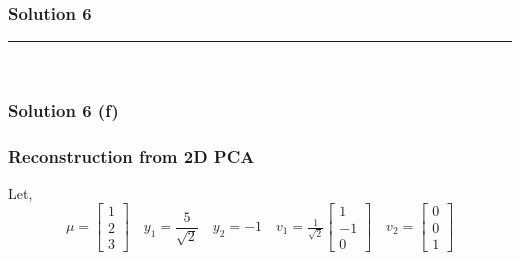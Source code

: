 \documentclass{article}
\begin{document}
{\newpage

\subsubsection*{Solution 6}
\noindent\rule{\textwidth}{0.4pt}\\
\subsubsection*{Solution 6 (f)}
\subsubsection*{Reconstruction from 2D PCA}
Let, \\
$$\mu = \begin{bmatrix}1 \\ 2 \\ 3\end{bmatrix} \quad y_1 = \frac{5}{\sqrt{2}} \quad y_2 = -1 \quad v_1=\tfrac{1}{\sqrt{2}}\begin{bmatrix}1 \\ -1 \\ 0\end{bmatrix} \quad v_2=\begin{bmatrix}0 \\ 0 \\ 1\end{bmatrix}$$ \\

}
\end{document}
